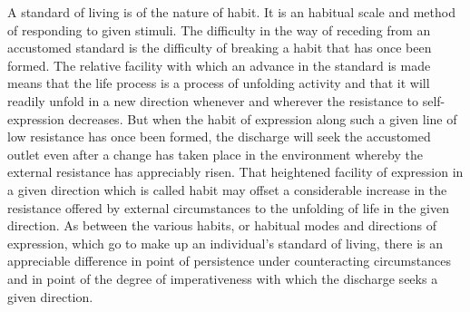 \documentclass[12pt]{report}
\begin{document}
A standard of living is of the nature of habit. It is an habitual scale
and method of responding to given stimuli. The difficulty in the way
of receding from an accustomed standard is the difficulty of breaking
a habit that has once been formed. The relative facility with which an
advance in the standard is made means that the life process is a process
of unfolding activity and that it will readily unfold in a new direction
whenever and wherever the resistance to self-expression decreases. But
when the habit of expression along such a given line of low resistance
has once been formed, the discharge will seek the accustomed outlet even
after a change has taken place in the environment whereby the external
resistance has appreciably risen. That heightened facility of expression
in a given direction which is called habit may offset a considerable
increase in the resistance offered by external circumstances to the
unfolding of life in the given direction. As between the various habits,
or habitual modes and directions of expression, which go to make up an
individual's standard of living, there is an appreciable difference in
point of persistence under counteracting circumstances and in point
of the degree of imperativeness with which the discharge seeks a given
direction.
\end{document}
